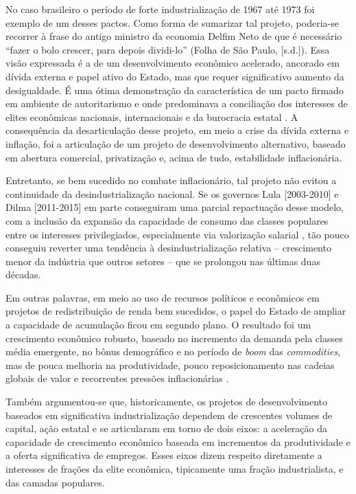 No caso brasileiro o período de forte industrialização de 1967 até 1973
foi exemplo de um desses pactos. Como forma de sumarizar tal projeto,
poderia-se recorrer à frase do antigo ministro da economia Delfim Neto
de que é necessário ``fazer o bolo crescer, para depois dividi-lo''
(Folha de São Paulo, {[}s.d.{]}). Essa visão expressada é a de um
desenvolvimento econômico acelerado, ancorado em dívida externa e papel
ativo do Estado, mas que requer significativo aumento da
desigualdade. É uma ótima demonstração da
característica de um pacto firmado em ambiente de autoritarismo e onde
predominava a conciliação dos interesses de elites econômicas nacionais,
internacionais e da burocracia estatal \citep{evans_dependent_1979}. A consequência da
desarticulação desse projeto, em meio a crise da dívida externa e
inflação, foi a articulação de um projeto de desenvolvimento
alternativo, baseado em abertura comercial, privatização e, acima de
tudo, estabilidade inflacionária.

Entretanto, se bem sucedido no combate inflacionário, tal projeto não
evitou a continuidade da desindustrialização nacional. Se os governos
Lula {[}2003-2010{]} e Dilma {[}2011-2015{]} em parte conseguiram uma
parcial repactuação desse modelo, com a inclusão da expansão da
capacidade de consumo das classes populares entre os interesses
privilegiados, especialmente via valorização salarial , tão pouco conseguiu reverter uma
tendência à desindustrialização relativa -- crescimento menor da
indústria que outros setores -- que se prolongou nas últimas duas
décadas.

Em outras palavras, em meio ao uso de recursos políticos e econômicos em
projetos de redistribuição de renda bem sucedidos, o papel do Estado de
ampliar a capacidade de acumulação ficou em segundo plano. O resultado
foi um crescimento econômico robusto, baseado no incremento da demanda
pela classes média emergente, no bônus demográfico e no período de
\emph{boom} das \emph{commodities}, mas de pouca melhoria na
produtividade, pouco reposicionamento nas cadeias globais de valor e
recorrentes pressões inflacionárias .

Também argumentou-se que, historicamente, os projetos de desenvolvimento
baseados em significativa industrialização dependem de crescentes
volumes de capital, ação estatal e se articularam em torno de dois
eixos: a aceleração da capacidade de crescimento econômico baseada em
incrementos da produtividade e a oferta significativa de empregos. Esses
eixos dizem respeito diretamente a interesses de frações da elite
econômica, tipicamente uma fração industrialista, e das camadas
populares.

